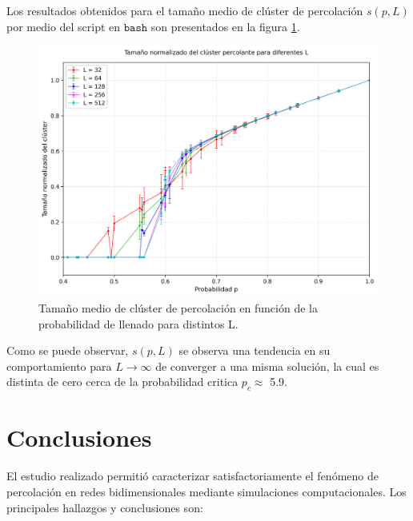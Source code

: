 \documentclass[12pt,a4paper]{article}
\begin{document}
Los resultados obtenidos para el tamaño medio de clúster de percolación $s(p,L)$ por medio del script en $\texttt{bash}$ son presentados en la figura \ref{fig:6}.

\begin{figure}[H]
   \centering
   \includegraphics[width=1.0\linewidth]{../figures/Cluster_all_L.png}
    \caption{Tamaño medio de clúster de percolación en función de la probabilidad de llenado para distintos L.}
    \label{fig:6}
\end{figure}

Como se puede observar, $s(p,L)$ se observa una tendencia en su comportamiento para $L\rightarrow\infty$ de converger a una misma solución, la cual es distinta de cero cerca de la probabilidad critica $p_c\approx$ 5.9. 

\section{Conclusiones}

El estudio realizado permitió caracterizar satisfactoriamente el fenómeno de percolación en redes bidimensionales mediante simulaciones computacionales. Los principales hallazgos y conclusiones son:
\end{document}
